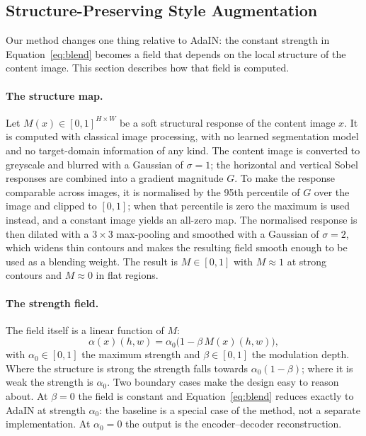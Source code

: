 \subsection{Structure-Preserving Style Augmentation}
\label{sec:structure_method}

Our method changes one thing relative to AdaIN: the constant strength in
Equation~\eqref{eq:blend} becomes a field that depends on the local
structure of the content image. This section describes how that field is
computed.

\paragraph{The structure map.}
Let $M(x) \in [0,1]^{H \times W}$ be a soft structural response of the
content image $x$. It is computed with classical image processing, with no
learned segmentation model and no target-domain information of any kind.
The content image is converted to greyscale and blurred with a Gaussian of
$\sigma = 1$; the horizontal and vertical Sobel responses are combined into
a gradient magnitude $G$\cite{opencv_sobel}. To make the response comparable across images, it
is normalised by the 95th percentile of $G$ over the image and clipped to
$[0,1]$; when that percentile is zero the maximum is used instead, and a
constant image yields an all-zero map. The normalised response is then
dilated with a $3\times3$ max-pooling and smoothed with a Gaussian of
$\sigma = 2$, which widens thin contours and makes the resulting field
smooth enough to be used as a blending weight. The result is $M \in [0,1]$
with $M \approx 1$ at strong contours and $M \approx 0$ in flat regions.

\paragraph{The strength field.}
The field itself is a linear function of $M$:
\begin{equation}
\alpha(x)(h,w) = \alpha_0 \bigl(1 - \beta\, M(x)(h,w)\bigr),
\label{eq:alphamap}
\end{equation}
with $\alpha_0 \in [0,1]$ the maximum strength and $\beta \in [0,1]$ the
modulation depth. Where the structure is strong the strength falls towards
$\alpha_0(1-\beta)$; where it is weak the strength is $\alpha_0$. Two
boundary cases make the design easy to reason about. At $\beta = 0$ the
field is constant and Equation~\eqref{eq:blend} reduces exactly to AdaIN at
strength $\alpha_0$: the baseline is a special case of the method, not a
separate implementation. At $\alpha_0 = 0$ the output is the
encoder--decoder reconstruction.

